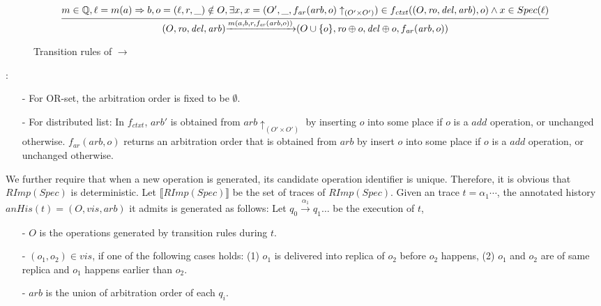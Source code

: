 \begin{figure}[ht]
\[
\begin{array}{l c}
\bigfrac{ m \in \mathbb{Q}, \ell = m(a) \Rightarrow b, o = (\ell,r,\_) \notin O, \exists x, x = (O',\_,f_{\mathit{ar}}(\mathit{arb},o) \uparrow_{(O' \times O')} ) \in f_{\mathit{ctxt}}((O,\mathit{ro},\mathit{del},\mathit{arb}),o) \wedge x \in Spec(\ell) }
{ (O,\mathit{ro},\mathit{del},\mathit{arb}) {\xrightarrow{m(a,b,r,f_{\mathit{ar}}(\mathit{arb},o))}} (O \cup \{ o \},\mathit{ro} \oplus o ,\mathit{del} \oplus o,f_{\mathit{ar}}(\mathit{arb},o)) } %
\end{array}
\]

\caption{Transition rules of $\rightarrow$}
\label{fig:transition rules of RImpSpec}
\end{figure}

{\color {red}
:

\begin{itemize}
\setlength{\itemsep}{0.5pt}
\item[-] For OR-set, the arbitration order is fixed to be $\emptyset$.

\item[-] For distributed list: In $f_{\mathit{ctxt}}$, $\mathit{arb}'$ is obtained from $\mathit{arb} \uparrow_{(O' \times O')}$ by inserting $o$ into some place if $o$ is a $add$ operation, or unchanged otherwise. $f_{\mathit{ar}}(\mathit{arb},o)$ returns an arbitration order that is obtained from $\mathit{arb}$ by insert $o$ into some place if $o$ is a $add$ operation, or unchanged otherwise.
\end{itemize}
}


We further require that when a new operation is generated, its candidate operation identifier is unique. Therefore, it is obvious that $RImp(Spec)$ is deterministic. Let $\llbracket RImp(Spec) \rrbracket$ be the set of traces of $RImp(Spec)$. Given an trace $ t= \alpha_1 \cdots$, the annotated history  $anHis(t) = (O,\mathit{vis},\mathit{arb})$ it admits is generated as follows: Let $q_0 {\xrightarrow{\alpha_1}} q_1 \ldots$ be the execution of $t$,

\begin{itemize}
\setlength{\itemsep}{0.5pt}
\item[-] $O$ is the operations generated by transition rules during $t$.

\item[-] $(o_1,o_2) \in \mathit{vis}$, if one of the following cases holds: (1) $o_1$ is delivered into replica of $o_2$ before $o_2$ happens, (2) $o_1$ and $o_2$ are of same replica and $o_1$ happens earlier than $o_2$.

\item[-] $\mathit{arb}$ is the union of arbitration order of each $q_i$.
\end{itemize}

